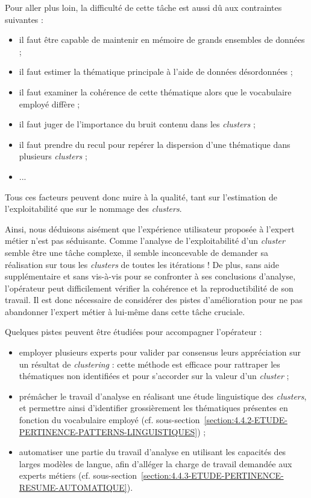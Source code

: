 			Pour aller plus loin, la difficulté de cette tâche est aussi dû aux contraintes suivantes :
			\begin{itemize}
				\item il faut être capable de maintenir en mémoire de grands ensembles de données ;
				\item il faut estimer la thématique principale à l'aide de données désordonnées ;
				\item il faut examiner la cohérence de cette thématique alors que le vocabulaire employé diffère ;
				\item il faut juger de l'importance du bruit contenu dans les \textit{clusters} ;
				\item il faut prendre du recul pour repérer la dispersion d'une thématique dans plusieurs \textit{clusters} ;
				\item ...
			\end{itemize}
			Tous ces facteurs peuvent donc nuire à la qualité, tant sur l'estimation de l'exploitabilité que sur le nommage des \textit{clusters}.
			
			Ainsi, nous déduisons aisément que l'expérience utilisateur proposée à l'expert métier n'est pas séduisante.
			Comme l'analyse de l'exploitabilité d'un \textit{cluster} semble être une tâche complexe, il semble inconcevable de demander sa réalisation sur tous les \textit{clusters} de toutes les itérations !
			De plus, sans aide supplémentaire et sans vis-à-vis pour se confronter à ses conclusions d'analyse, l'opérateur peut difficilement vérifier la cohérence et la reproductibilité de son travail.
			Il est donc nécessaire de considérer des pistes d'amélioration pour ne pas abandonner l'expert métier à lui-même dans cette tâche cruciale.
			
			Quelques pistes peuvent être étudiées pour accompagner l'opérateur :
			\begin{itemize}
				\item employer plusieurs experts pour valider par consensus leurs appréciation sur un résultat de \textit{clustering} : cette méthode est efficace pour rattraper les thématiques non identifiées et pour s'accorder sur la valeur d'un \textit{cluster} ;
				\item prémâcher le travail d'analyse en réalisant une étude linguistique des \textit{clusters}, et permettre ainsi d'identifier grossièrement les thématiques présentes en fonction du vocabulaire employé (cf. sous-section~\ref{section:4.4.2-ETUDE-PERTINENCE-PATTERNS-LINGUISTIQUES}) ;
				\item automatiser une partie du travail d'analyse en utilisant les capacités des larges modèles de langue, afin d'alléger la charge de travail demandée aux experts métiers (cf. sous-section~\ref{section:4.4.3-ETUDE-PERTINENCE-RESUME-AUTOMATIQUE}).
			\end{itemize}
	
